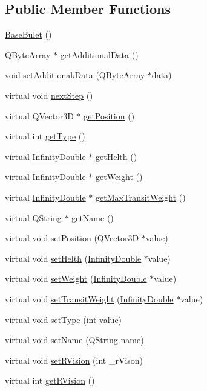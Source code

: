 \subsection*{Public Member Functions}
\begin{DoxyCompactItemize}
\item 
\hyperlink{a00153_abdfda473d6ddd2a2fb35783dfa5ef836}{Base\+Bulet} ()
\item 
Q\+Byte\+Array $\ast$ \hyperlink{a00153_a307a62b59328f9e2a0530f559aba0dcb}{get\+Additional\+Data} ()
\item 
void \hyperlink{a00153_ae97774994602a89562688f97339b9eb3}{set\+Additionak\+Data} (Q\+Byte\+Array $\ast$data)
\item 
virtual void \hyperlink{a00137_ae2be75da1a2a9edfabe993770e24654a}{next\+Step} ()
\item 
virtual Q\+Vector3D $\ast$ \hyperlink{a00137_a3159c02c1118989e3476b52d89a52401}{get\+Position} ()
\item 
virtual int \hyperlink{a00137_a639bd1e233821ff606bb8fe2931f6ee7}{get\+Type} ()
\item 
virtual \hyperlink{a00161}{Infinity\+Double} $\ast$ \hyperlink{a00137_a13a00e39ece3e20e3f5e049224da8d40}{get\+Helth} ()
\item 
virtual \hyperlink{a00161}{Infinity\+Double} $\ast$ \hyperlink{a00137_a935a07134430bbb44c3214629d607a3d}{get\+Weight} ()
\item 
virtual \hyperlink{a00161}{Infinity\+Double} $\ast$ \hyperlink{a00137_a4c74c903e19ada9da9150cf9569b4e9d}{get\+Max\+Transit\+Weight} ()
\item 
virtual Q\+String $\ast$ \hyperlink{a00137_a01051b9a502128a82f9a168a14d1ecdc}{get\+Name} ()
\item 
virtual void \hyperlink{a00137_a54dc1a743fac99db03c3f47b5c6d69c4}{set\+Position} (Q\+Vector3D $\ast$value)
\item 
virtual void \hyperlink{a00137_a2f95e7a61b5db7f2fbbfd32ff786f58c}{set\+Helth} (\hyperlink{a00161}{Infinity\+Double} $\ast$value)
\item 
virtual void \hyperlink{a00137_a4b5e42aa7985c9bf959f0275cbc1bac7}{set\+Weight} (\hyperlink{a00161}{Infinity\+Double} $\ast$value)
\item 
virtual void \hyperlink{a00137_ac480b8140b5b290f49b4b96a47291180}{set\+Transit\+Weight} (\hyperlink{a00161}{Infinity\+Double} $\ast$value)
\item 
virtual void \hyperlink{a00137_a324cba2176155a50b5a2239eb0a8b6a0}{set\+Type} (int value)
\item 
virtual void \hyperlink{a00137_a874f246d3249a989750e3db85ea4bfcd}{set\+Name} (Q\+String \hyperlink{a00137_af35fba4ed599605c3d78b3c3a71fa467}{name})
\item 
virtual void \hyperlink{a00137_a2719e14051c30f39ca60f4998e48abf9}{set\+R\+Vision} (int \+\_\+r\+Vison)
\item 
virtual int \hyperlink{a00137_a4437ee7dcdb6e3e3c58c8b00d8bb0500}{get\+R\+Vision} ()
\end{DoxyCompactItemize}
